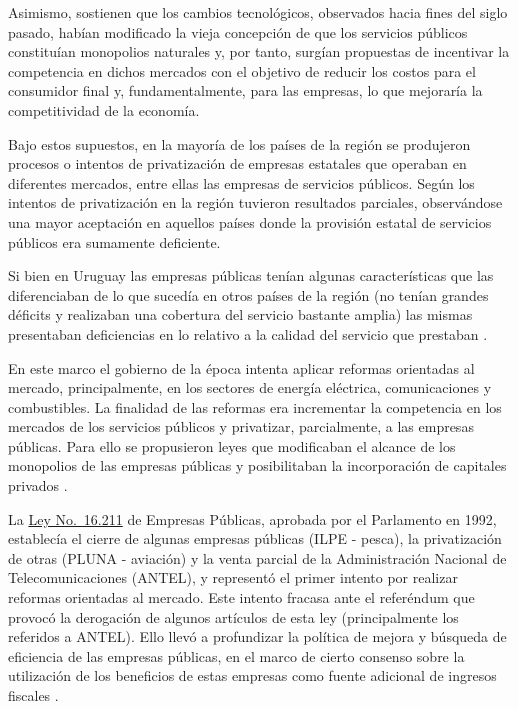 \documentclass[
  12pt,
  spanish,
]{book}
\begin{document}
Asimismo, sostienen que los cambios tecnológicos, observados hacia fines
del siglo pasado, habían modificado la vieja concepción de que los
servicios públicos constituían monopolios naturales y, por tanto,
surgían propuestas de incentivar la competencia en dichos mercados con
el objetivo de reducir los costos para el consumidor final y,
fundamentalmente, para las empresas, lo que mejoraría la competitividad
de la economía.

Bajo estos supuestos, en la mayoría de los países de la región se
produjeron procesos o intentos de privatización de empresas estatales
que operaban en diferentes mercados, entre ellas las empresas de
servicios públicos. Según \citet{Bergara2005} los intentos de
privatización en la región tuvieron resultados parciales, observándose
una mayor aceptación en aquellos países donde la provisión estatal de
servicios públicos era sumamente deficiente.

Si bien en Uruguay las empresas públicas tenían algunas características
que las diferenciaban de lo que sucedía en otros países de la región (no
tenían grandes déficits y realizaban una cobertura del servicio bastante
amplia) las mismas presentaban deficiencias en lo relativo a la calidad
del servicio que prestaban \citep{Forteza2003}.

En este marco el gobierno de la época intenta aplicar reformas
orientadas al mercado, principalmente, en los sectores de energía
eléctrica, comunicaciones y combustibles. La finalidad de las reformas
era incrementar la competencia en los mercados de los servicios públicos
y privatizar, parcialmente, a las empresas públicas. Para ello se
propusieron leyes que modificaban el alcance de los monopolios de las
empresas públicas y posibilitaban la incorporación de capitales privados
\citep{Bergara2005}.

La \href{http://www.parlamento.gub.uy/leyes/ley16211.htm}{Ley
No.~16.211} de Empresas Públicas, aprobada por el Parlamento en 1992,
establecía el cierre de algunas empresas públicas (ILPE - pesca), la
privatización de otras (PLUNA - aviación) y la venta parcial de la
Administración Nacional de Telecomunicaciones (ANTEL), y representó el
primer intento por realizar reformas orientadas al mercado. Este intento
fracasa ante el referéndum que provocó la derogación de algunos
artículos de esta ley (principalmente los referidos a ANTEL). Ello llevó
a profundizar la política de mejora y búsqueda de eficiencia de las
empresas públicas, en el marco de cierto consenso sobre la utilización
de los beneficios de estas empresas como fuente adicional de ingresos
fiscales \citep{Bergara2005}.
\end{document}
